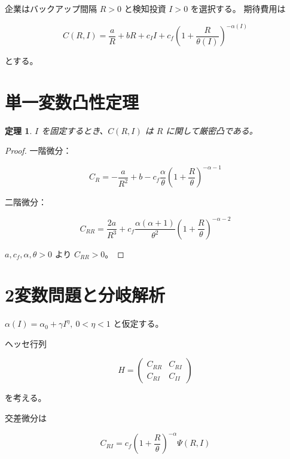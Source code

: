 \documentclass[12pt,a4paper]{article}
\newtheorem{theorem}{定理}
\begin{document}
企業はバックアップ間隔 $R>0$ と検知投資 $I>0$ を選択する。
期待費用は

\begin{equation}
C(R,I)=\frac{a}{R}+bR+c_I I+c_f\left(1+\frac{R}{\theta(I)}\right)^{-\alpha(I)}
\end{equation}

とする。

\section{単一変数凸性定理}

\begin{theorem}
$I$ を固定するとき、$C(R,I)$ は $R$ に関して厳密凸である。
\end{theorem}

\begin{proof}
一階微分：

\begin{equation}
C_R=-\frac{a}{R^2}+b-c_f\frac{\alpha}{\theta}\left(1+\frac{R}{\theta}\right)^{-\alpha-1}
\end{equation}

二階微分：

\begin{equation}
C_{RR}=\frac{2a}{R^3}+c_f\frac{\alpha(\alpha+1)}{\theta^2}\left(1+\frac{R}{\theta}\right)^{-\alpha-2}
\end{equation}

$a,c_f,\alpha,\theta>0$ より $C_{RR}>0$。
\end{proof}

\section{2変数問題と分岐解析}

$\alpha(I)=\alpha_0+\gamma I^\eta,\ 0<\eta<1$ と仮定する。

ヘッセ行列

\begin{equation}
H=\begin{pmatrix}
C_{RR} & C_{RI} \\
C_{RI} & C_{II}
\end{pmatrix}
\end{equation}

を考える。

交差微分は

\begin{equation}
C_{RI}=c_f\left(1+\frac{R}{\theta}\right)^{-\alpha}\Psi(R,I)
\end{equation}
\end{document}
